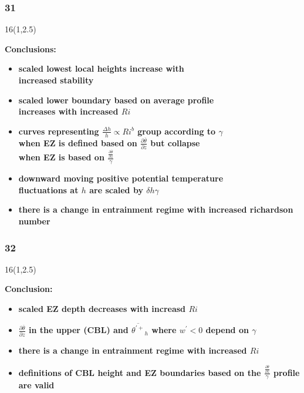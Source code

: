 \documentclass{beamer}
\newcommand\FrameText[1]{
\begin{textblock}{16}(1,2.5)
\raggedright #1
\end{textblock}}
\begin{document}
\begin{frame}
\frametitle{31}
\FrameText{\bf{\large Conclusions:}
\vspace{5mm}
\begin{itemize}
\item \bf{\large scaled lowest local heights increase with\\
 increased stability}
\vspace{5mm}
\item \bf{\large scaled lower boundary based on average profile\\
increases with increased $Ri$}
\vspace{5mm}
\item \bf{\large curves representing  $\frac{\Delta h}{h} \propto Ri ^{b}$ group according to $\gamma$\\
when EZ is defined based on $\frac{\partial \overline{\theta}}{\partial z}$ but collapse\\
when EZ is based on $\frac{\frac{\partial \overline{\theta}}{\partial z}}{\gamma}$}
\vspace{5mm} 
\item \bf{\large downward moving positive potential temperature\\
fluctuations at $h$ are scaled by $\delta h \gamma$}
\vspace{5mm}
\item \bf{\large there is a change in entrainment regime with increased richardson number}
\end{itemize}
}
\end{frame}

\begin{frame}
\frametitle{32}
\FrameText{\bf{\large Conclusion:}
\vspace{5mm}
\begin{itemize}
\item \bf{\large scaled EZ depth decreases with increasd $Ri$}
\vspace{5mm}
\item \bf{\large $\frac{\partial \overline{\theta}}{\partial z}$ in the upper (CBL) and  $\overline{\theta^{'+}}_{h}$ where $w^{'}<0$ depend on $\gamma$}
\vspace{5mm}
\item \bf{\large there is a change in entrainment regime with increased $Ri$}
\vspace{5mm}
\item \bf{\large definitions of CBL height and EZ boundaries based on the $\frac{\frac{\partial \overline{\theta}}{\partial z}}{\gamma}$ profile are valid}
\end{itemize}
}
\end{frame}
\end{document}
